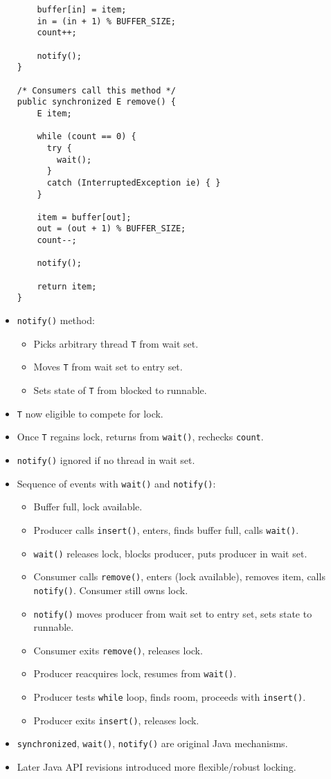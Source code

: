 \begin{itemize}
\begin{verbatim}
    buffer[in] = item;
    in = (in + 1) % BUFFER_SIZE;
    count++;
 
    notify();
}

/* Consumers call this method */
public synchronized E remove() {
    E item;
 
    while (count == 0) {
      try {
        wait();
      }
      catch (InterruptedException ie) { }
    }
 
    item = buffer[out];
    out = (out + 1) % BUFFER_SIZE;
    count--;
 
    notify();
 
    return item;
}
    \end{verbatim}
    \item \texttt{notify()} method:
    \begin{itemize}
        \item Picks arbitrary thread \texttt{T} from wait set.
        \item Moves \texttt{T} from wait set to entry set.
        \item Sets state of \texttt{T} from blocked to runnable.
    \end{itemize}
    \item \texttt{T} now eligible to compete for lock.
    \item Once \texttt{T} regains lock, returns from \texttt{wait()}, rechecks \texttt{count}.
    \item \texttt{notify()} ignored if no thread in wait set.
    \item Sequence of events with \texttt{wait()} and \texttt{notify()}:
    \begin{itemize}
        \item Buffer full, lock available.
        \item Producer calls \texttt{insert()}, enters, finds buffer full, calls \texttt{wait()}.
        \item \texttt{wait()} releases lock, blocks producer, puts producer in wait set.
        \item Consumer calls \texttt{remove()}, enters (lock available), removes item, calls \texttt{notify()}. Consumer still owns lock.
        \item \texttt{notify()} moves producer from wait set to entry set, sets state to runnable.
        \item Consumer exits \texttt{remove()}, releases lock.
        \item Producer reacquires lock, resumes from \texttt{wait()}.
        \item Producer tests \texttt{while} loop, finds room, proceeds with \texttt{insert()}.
        \item Producer exits \texttt{insert()}, releases lock.
    \end{itemize}
    \item \texttt{synchronized}, \texttt{wait()}, \texttt{notify()} are original Java mechanisms.
    \item Later Java API revisions introduced more flexible/robust locking.
\end{itemize}

